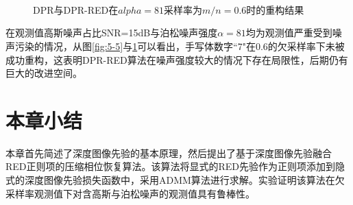 \begin{figure}[!hptb]		
	\centering
	\\
	\subfigure[DPR算法重构结果]{
		\begin{minipage}[t]{\linewidth}
			\centering
			\texttt{[image: 5-7-1]}
			\texttt{[image: 5-7-2]}
			\texttt{[image: 5-7-3]}
			\texttt{[image: 5-7-4]}
			\texttt{[image: 5-7-5]}
			\texttt{[image: 5-7-6]}
		\end{minipage}
	}
	\\
	\caption{DPR与DPR-RED在$alpha=81$采样率为$m/n=0.6$时的重构结果}
	\label{fig:5-6} 
\end{figure}

在观测值高斯噪声占比SNR=15dB与泊松噪声强度$\alpha=81$均为观测值严重受到噪声污染的情况，从图\ref{fig:5-5}与\ref{fig:5-6}可以看出，手写体数字``7"在0.6的欠采样率下未被成功重构，这表明DPR-RED算法在噪声强度较大的情况下存在局限性，后期仍有巨大的改进空间。

\section{本章小结}
本章首先简述了深度图像先验的基本原理，然后提出了基于深度图像先验融合RED正则项的压缩相位恢复算法。该算法将显式的RED先验作为正则项添加到隐式的深度图像先验损失函数中，采用ADMM算法进行求解。实验证明该算法在欠采样率观测值下对含高斯与泊松噪声的观测值具有鲁棒性。

